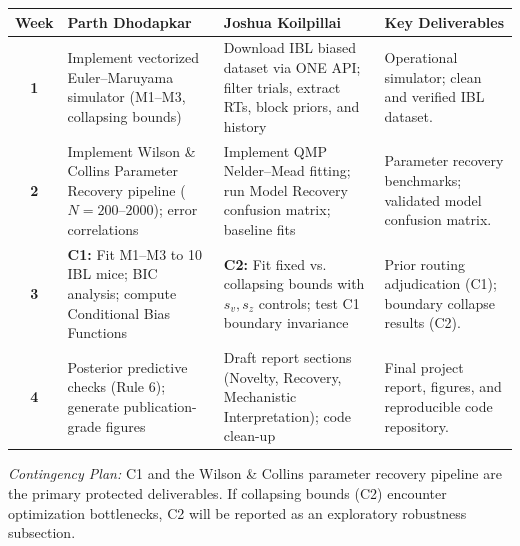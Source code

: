 \documentclass[10pt,a4paper]{article}
\begin{document}
\begin{table}[h!]
\centering
\small
\begin{tabularx}{\textwidth}{c >{\raggedright\arraybackslash}p{4.8cm} >{\raggedright\arraybackslash}p{4.8cm} >{\raggedright\arraybackslash}X}
\toprule
\textbf{Week} & \textbf{Parth Dhodapkar} & \textbf{Joshua Koilpillai} & \textbf{Key Deliverables} \\
\midrule
\textbf{1} & Implement vectorized Euler--Maruyama simulator (M1--M3, collapsing bounds) & Download IBL biased dataset via ONE API; filter trials, extract RTs, block priors, and history & Operational simulator; clean and verified IBL dataset. \\
\textbf{2} & Implement Wilson \& Collins Parameter Recovery pipeline ($N = 200\text{--}2000$); error correlations & Implement QMP Nelder--Mead fitting; run Model Recovery confusion matrix; baseline fits & Parameter recovery benchmarks; validated model confusion matrix. \\
\textbf{3} & \textbf{C1:} Fit M1--M3 to 10 IBL mice; BIC analysis; compute Conditional Bias Functions & \textbf{C2:} Fit fixed vs. collapsing bounds with $s_v, s_z$ controls; test C1 boundary invariance & Prior routing adjudication (C1); boundary collapse results (C2). \\
\textbf{4} & Posterior predictive checks (Rule 6); generate publication-grade figures & Draft report sections (Novelty, Recovery, Mechanistic Interpretation); code clean-up & Final project report, figures, and reproducible code repository. \\
\bottomrule
\end{tabularx}
\end{table}

\noindent\textit{Contingency Plan:} C1 and the Wilson \& Collins parameter recovery pipeline are the primary protected deliverables. If collapsing bounds (C2) encounter optimization bottlenecks, C2 will be reported as an exploratory robustness subsection.
\end{document}
